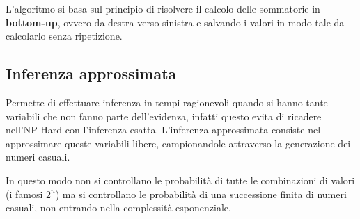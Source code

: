 L'algoritmo si basa sul principio di risolvere il calcolo delle sommatorie in
\textbf{bottom-up}, ovvero da destra verso sinistra e salvando i valori in modo
tale da calcolarlo senza ripetizione.
\subsection{Inferenza approssimata}
Permette di effettuare inferenza in tempi ragionevoli quando si hanno tante
variabili che non fanno parte dell'evidenza, infatti questo evita di ricadere
nell'NP-Hard con l'inferenza esatta. L'inferenza approssimata consiste nel
approssimare queste variabili libere, campionandole attraverso la generazione dei
numeri casuali.

In questo modo non si controllano le probabilità di tutte le combinazioni di valori
(i famosi $2^n$) ma si controllano le probabilità di una successione finita di
numeri casuali, non entrando nella complessità esponenziale.
